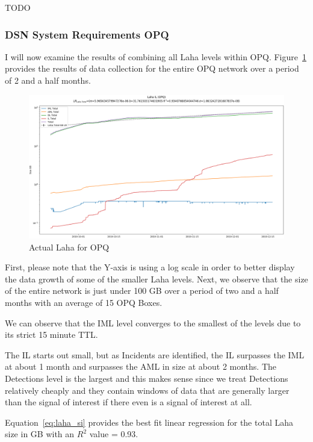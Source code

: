 TODO

\subsubsection{DSN System Requirements OPQ}

I will now examine the results of combining all Laha levels within OPQ. Figure~\ref{fig:actual_laha_opq} provides the results of data collection for the entire OPQ network over a period of 2 and a half months.

\begin{figure}[H]
    \centering
    \includegraphics[width=\linewidth]{figures/actual_laha_opq.png}
    \caption{Actual Laha for OPQ}
    \label{fig:actual_laha_opq}
\end{figure}

First, please note that the Y-axis is using a log scale in order to better display the data growth of some of the smaller Laha levels. Next, we observe that the size of the entire network is just under 100 GB over a period of two and a half months with an average of 15 OPQ Boxes.

We can observe that the IML level converges to the smallest of the levels due to its strict 15 minute TTL.

The IL starts out small, but as Incidents are identified, the IL surpasses the IML at about 1 month and surpasses the AML in size at about 2 months. The Detections level is the largest and this makes sense since we treat Detections relatively cheaply and they contain windows of data that are generally larger than the signal of interest if there even is a signal of interest at all.

Equation~\ref{eq:laha_si} provides the best fit linear regression for the total Laha size in GB with an $R^2$ value = 0.93.

